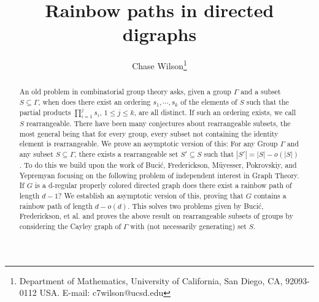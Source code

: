 \documentclass[11pt,a4paper]{article}
\title{Rainbow paths in directed digraphs}
\author{
Chase Wilson\thanks{Department of Mathematics, University of California, San Diego, CA, 92093-0112 USA. E-mail: c7wilson@ucsd.edu}}
\begin{document}
\date{ }
\setlength{\droptitle}{-2.5cm}
\maketitle
\vspace{-0.5in}
\begin{abstract}
An old problem in combinatorial group theory asks, given a group $\Gamma$ and a subset $S \subseteq \Gamma$, when does there exist an ordering $s_1, \cdots, s_k$ of the elements of $S$ such that the partial products $\prod_{i = 1}^j s_i$, $1 \leq j \leq k$, are all distinct. If such an ordering exists, we call $S$ rearrangeable. There have been many conjectures about rearrangeable subsets, the most general being that for every group, every subset not containing the identity element is rearrangeable. We prove an asymptotic version of this: For any Group $\Gamma$ and any subset $S \subseteq \Gamma$, there exists a rearrangeable set $S' \subseteq S$ such that $|S'| = |S| - o(|S|)$.
To do this we build upon the work of Buci\'c, Frederickson, M\"uyesser, Pokrovskiy, and Yepremyan focusing on the following problem of independent interest in Graph Theory. If $G$ is a d-regular properly colored directed graph does there exist a rainbow path of length $d - 1$? We establish an asymptotic version of this, proving that $G$ contains a rainbow path of length $d - o(d)$. This solves two problems given by Buci\'c, Frederickson, et al. and proves the above result on rearrangeable subsets of groups by considering the Cayley graph of $\Gamma$ with (not necessarily generating) set $S$.
\end{abstract}
\end{document}
